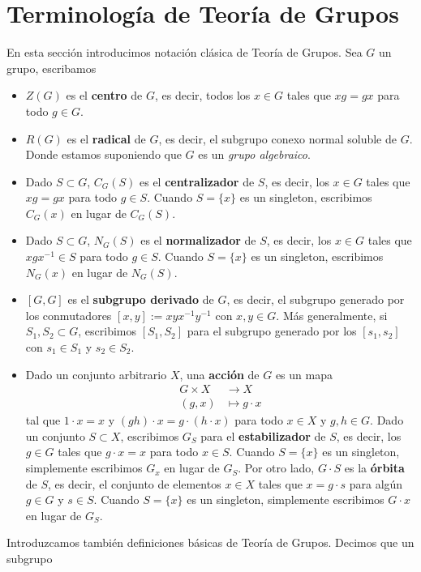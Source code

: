 \documentclass[spanish,10pt]{amsart}
\theoremstyle{definition}
\theoremstyle{remark}
\numberwithin{equation}{section}
\begin{document}
\section{Terminología de Teoría de Grupos}
En esta sección introducimos notación clásica de Teoría de Grupos. Sea $G$ un grupo, escribamos
\begin{itemize}
\item $Z(G)$ es el \textbf{centro} de $G$, es decir, todos los $x \in G$ tales que $x g = g x$ para todo $g \in G$.
\item $R(G)$ es el \textbf{radical} de $G$, es decir, el subgrupo conexo normal soluble de $G$. Donde estamos suponiendo que $G$ es un \textit{grupo algebraico}.
\item Dado $S \subset G$, $C_G (S)$ es el \textbf{centralizador} de $S$, es decir, los $x \in G$ tales que $x g = g x$ para todo $g \in S$. Cuando $S = \{x\}$ es un singleton, escribimos $C_G (x)$ en lugar de $C_G (S)$.
\item Dado $S \subset G$, $N_G (S)$ es el \textbf{normalizador} de $S$, es decir, los $x \in G$ tales que $x g x^{-1} \in S$ para todo $g \in S$. Cuando $S = \{x\}$ es un singleton, escribimos $N_G (x)$ en lugar de $N_G (S)$.
\item $[G,G]$ es el \textbf{subgrupo derivado} de $G$, es decir, el subgrupo generado por los conmutadores $[x,y] := x y x^{-1}y^{-1}$ con $x,y \in G$. Más generalmente, si $S_1, S_2 \subset G$, escribimos $[S_1, S_2]$ para el subgrupo generado por los $[s_1,s_2]$ con $s_1 \in S_1 $ y $s_2 \in S_2$.
\item Dado un conjunto arbitrario $X$, una \textbf{acción} de $G$ es un mapa
\begin{align*}
G \times X &\longrightarrow X \\
(g,x) &\longmapsto g \cdot x
\end{align*}
tal que $1 \cdot x = x$ y $(gh) \cdot x = g \cdot (h \cdot x)$ para todo $x \in X$ y $g,h \in G$. Dado un conjunto $S \subset X$, escribimos $G_S$ para el \textbf{estabilizador} de $S$, es decir, los $g \in G$ tales que $g \cdot x = x$ para todo $x \in S$. Cuando $S = \{x\}$ es un singleton, simplemente escribimos $G_x$ en lugar de $G_S$. Por otro lado, $G \cdot S$ es la \textbf{órbita} de $S$, es decir, el conjunto de elementos $x \in X$ tales que $x = g \cdot s$ para algún $g \in G$ y $s \in S$. Cuando $S = \{x\}$ es un singleton, simplemente escribimos $G \cdot x$ en lugar de $G_S$.
\end{itemize}

Introduzcamos también definiciones básicas de Teoría de Grupos. Decimos que un subgrupo
\end{document}
